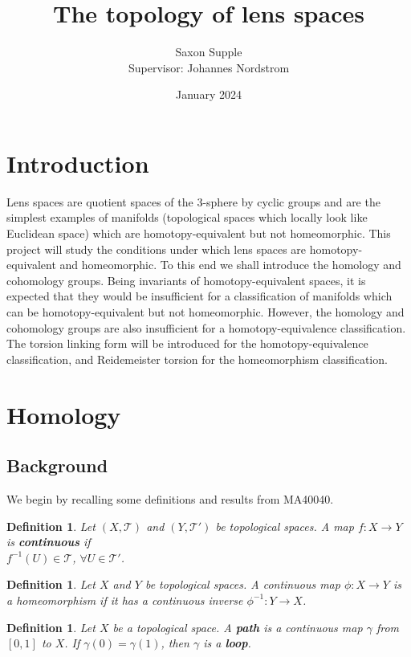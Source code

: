 \documentclass{article}
\title{The topology of lens spaces}
\author{Saxon Supple\\Supervisor: Johannes Nordstrom}
\date{January 2024}
\newtheorem{definition}[theorem]{Definition}
\begin{document}
\maketitle
\tableofcontents
\section{Introduction}
Lens spaces are quotient spaces of the $3$-sphere by cyclic groups and are the simplest examples of manifolds (topological spaces which locally look like Euclidean space) which are homotopy-equivalent but not homeomorphic. This project will study the conditions under which lens spaces are homotopy-equivalent and homeomorphic. To this end we shall introduce the homology and cohomology groups. Being invariants of homotopy-equivalent spaces, it is expected that they would be insufficient for a classification of manifolds which can be homotopy-equivalent but not homeomorphic. However, the homology and cohomology groups are also insufficient for a homotopy-equivalence classification. The torsion linking form will be introduced for the homotopy-equivalence classification, and Reidemeister torsion for the homeomorphism classification.
\section{Homology}
\subsection{Background}
We begin by recalling some definitions and results from MA40040.
\begin{definition}
Let $(X,\mathcal{T})$ and $(Y,\mathcal{T}')$ be topological spaces. A map $f\colon X\to Y$ is \textbf{continuous} if\\
$f^{-1}(U)\in\mathcal{T}$, $\forall U\in\mathcal{T}'$.
\end{definition}

\begin{definition}
Let $X$ and $Y$ be topological spaces. A continuous map $\phi\colon X\to Y$ is a homeomorphism if it has a continuous inverse $\phi^{-1}\colon Y\to X$.
\end{definition}

\begin{definition}
Let $X$ be a topological space. A \textbf{path} is a continuous map $\gamma$ from $[0,1]$ to $X$. If $\gamma(0)=\gamma(1)$, then $\gamma$ is a \textbf{loop}.
\end{definition}
\end{document}
